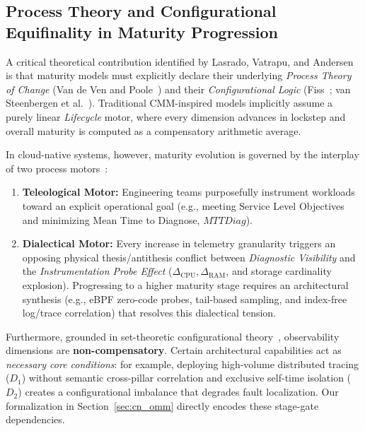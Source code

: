 \subsection{Process Theory and Configurational Equifinality in Maturity Progression}
\label{subsec:process_configurational}

A critical theoretical contribution identified by Lasrado, Vatrapu, and Andersen~\cite{lasrado_2015} is that maturity models must explicitly declare their underlying \textit{Process Theory of Change} (Van de Ven and Poole~\cite{vandeven_1995}) and their \textit{Configurational Logic} (Fiss~\cite{fiss_2011}; van Steenbergen et al.~\cite{vansteenbergen_2010}). Traditional CMM-inspired models implicitly assume a purely linear \textit{Lifecycle} motor, where every dimension advances in lockstep and overall maturity is computed as a compensatory arithmetic average.

In cloud-native systems, however, maturity evolution is governed by the interplay of two process motors~\cite{vandeven_1995}:
\begin{enumerate}[leftmargin=*, nosep]
    \item \textbf{Teleological Motor:} Engineering teams purposefully instrument workloads toward an explicit operational goal (e.g., meeting Service Level Objectives and minimizing Mean Time to Diagnose, $MTTDiag$).
    \item \textbf{Dialectical Motor:} Every increase in telemetry granularity triggers an opposing physical thesis/antithesis conflict between \textit{Diagnostic Visibility} and the \textit{Instrumentation Probe Effect} ($\Delta_{\text{CPU}}, \Delta_{\text{RAM}}$, and storage cardinality explosion). Progressing to a higher maturity stage requires an architectural synthesis (e.g., eBPF zero-code probes, tail-based sampling, and index-free log/trace correlation) that resolves this dialectical tension.
\end{enumerate}

Furthermore, grounded in set-theoretic configurational theory~\cite{fiss_2011, lasrado_2015}, observability dimensions are \textbf{non-compensatory}. Certain architectural capabilities act as \textit{necessary core conditions}: for example, deploying high-volume distributed tracing ($D_1$) without semantic cross-pillar correlation and exclusive self-time isolation ($D_2$) creates a configurational imbalance that degrades fault localization. Our formalization in Section~\ref{sec:cn_omm} directly encodes these stage-gate dependencies.
